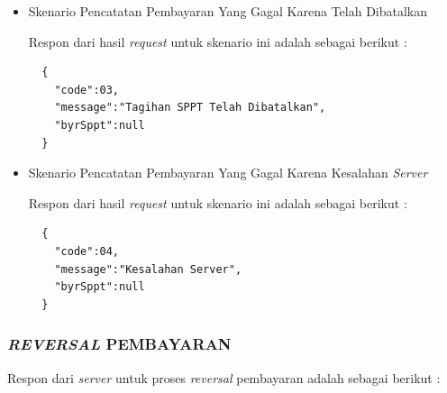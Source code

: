 \documentclass[pdftex,12pt, oneside]{article}
\begin{document}
\begin{itemize}
  \item Skenario Pencatatan Pembayaran Yang Gagal Karena Telah Dibatalkan
  
  Respon dari hasil \textit{request} untuk skenario ini adalah sebagai berikut :
  
  \begin{lstlisting}
  {
    "code":03,
    "message":"Tagihan SPPT Telah Dibatalkan",
    "byrSppt":null
  }
  \end{lstlisting}
  
  \item Skenario Pencatatan Pembayaran Yang Gagal Karena Kesalahan \textit{Server}
  
  Respon dari hasil \textit{request} untuk skenario ini adalah sebagai berikut :
  
  \begin{lstlisting}
  {
    "code":04,
    "message":"Kesalahan Server",
    "byrSppt":null
  }
  \end{lstlisting}
  
\end{itemize}

\subsubsection{\textit{REVERSAL} PEMBAYARAN}

Respon dari \textit{server} untuk proses \textit{reversal} pembayaran adalah sebagai berikut :
\end{document}
